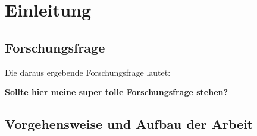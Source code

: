 \chapter{Einleitung}
\section{Forschungsfrage}
Die daraus ergebende Forschungsfrage lautet:

    \textbf{Sollte hier meine super tolle Forschungsfrage stehen?}
\section{Vorgehensweise und Aufbau der Arbeit}